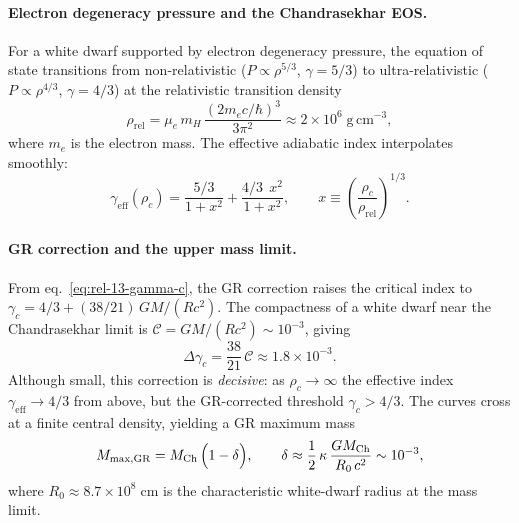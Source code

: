 \paragraph{Electron degeneracy pressure and the Chandrasekhar EOS.}
For a white dwarf supported by electron degeneracy pressure, the
equation of state transitions from non-relativistic
($P \propto \rho^{5/3}$, $\gamma = 5/3$) to ultra-relativistic
($P \propto \rho^{4/3}$, $\gamma = 4/3$) at the relativistic
transition density
\begin{equation}
\label{eq:rel-13-rho-rel}
\rho_{\mathrm{rel}}
  = \mu_{e}\,m_{H}\,
    \frac{(2m_{e}c/\hbar)^{3}}{3\pi^{2}}
  \approx 2 \times 10^{6}\;\mathrm{g\,cm^{-3}},
\end{equation}
where $m_{e}$ is the electron mass.  The effective adiabatic index
interpolates smoothly:
\begin{equation}
\label{eq:rel-13-gamma-interp}
\gamma_{\mathrm{eff}}(\rho_{c})
  = \frac{5/3}{1 + x^{2}} + \frac{4/3\;\,x^{2}}{1 + x^{2}},
  \qquad
  x \equiv \left(\frac{\rho_{c}}{\rho_{\mathrm{rel}}}\right)^{1/3}.
\end{equation}

\paragraph{GR correction and the upper mass limit.}
From eq.~\eqref{eq:rel-13-gamma-c}, the GR correction raises the
critical index to $\gamma_{c} = 4/3 + (38/21)\,GM/(Rc^{2})$.  The
compactness of a white dwarf near the Chandrasekhar limit is
$\mathcal{C} = GM/(Rc^{2}) \sim 10^{-3}$, giving
\begin{equation}
\label{eq:rel-13-delta-gamma-wd}
\Delta\gamma_{c}
  = \frac{38}{21}\,\mathcal{C}
  \approx 1.8 \times 10^{-3}.
\end{equation}
Although small, this correction is \emph{decisive}: as
$\rho_{c} \to \infty$ the effective index
$\gamma_{\mathrm{eff}} \to 4/3$ from above, but the GR-corrected
threshold $\gamma_{c} > 4/3$.  The curves cross at a finite central
density, yielding a GR maximum mass
\begin{equation}
\label{eq:rel-13-MGR-max}
M_{\max,\mathrm{GR}}
  = M_{\mathrm{Ch}}\,\Bigl(1 - \delta\Bigr),
  \qquad
  \delta \approx \frac{1}{2}\,\kappa\,\frac{GM_{\mathrm{Ch}}}{R_{0}\,c^{2}}
  \sim 10^{-3},
\end{equation}
where $R_{0} \approx 8.7 \times 10^{8}\;\mathrm{cm}$ is the
characteristic white-dwarf radius at the mass limit.

